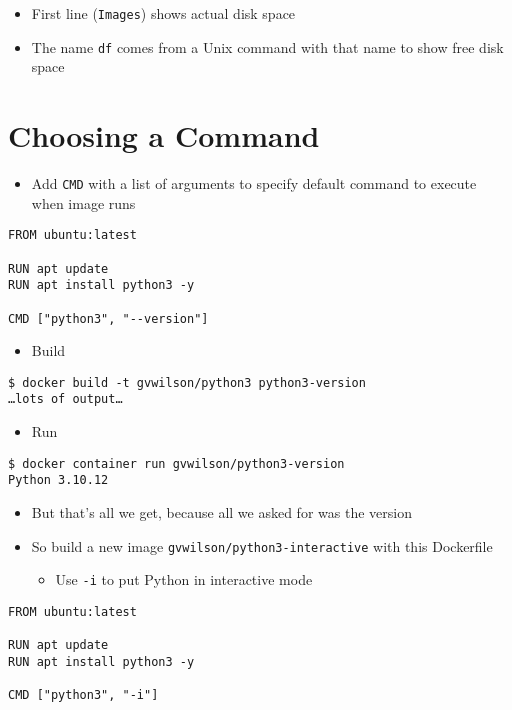 \documentclass[krantzl]{krantz}
\begin{document}
\begin{itemize}
\item First line (\texttt{Images}) shows actual disk space

\item The name \texttt{df} comes from a Unix command with that name to show free disk space

\end{itemize}
\section{Choosing a Command}
\begin{itemize}
\item Add \texttt{CMD} with a list of arguments to specify default command to execute when image runs

\end{itemize}
\begin{lstlisting}[frame=tblr]
FROM ubuntu:latest

RUN apt update
RUN apt install python3 -y

CMD ["python3", "--version"]
\end{lstlisting}

\begin{itemize}
\item Build

\end{itemize}
\begin{lstlisting}[frame=tblr,backgroundcolor=\color{black!5}]
$ docker build -t gvwilson/python3 python3-version
…lots of output…
\end{lstlisting}

\begin{itemize}
\item Run

\end{itemize}
\begin{lstlisting}[frame=tblr,backgroundcolor=\color{black!5}]
$ docker container run gvwilson/python3-version
Python 3.10.12
\end{lstlisting}

\begin{itemize}
\item But that’s all we get, because all we asked for was the version

\item So build a new image \texttt{gvwilson/python3-interactive} with this Dockerfile\begin{itemize}
\item Use \texttt{-i} to put Python in interactive mode

\end{itemize}


\end{itemize}
\begin{lstlisting}[frame=tblr]
FROM ubuntu:latest

RUN apt update
RUN apt install python3 -y

CMD ["python3", "-i"]
\end{lstlisting}
\end{document}
